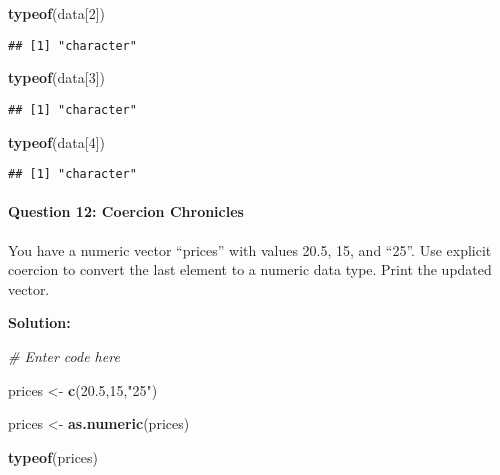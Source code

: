\documentclass[
]{article}
\newenvironment{Shaded}{\begin{snugshade}}{\end{snugshade}}
\newcommand{\CommentTok}[1]{\textcolor[rgb]{0.56,0.35,0.01}{\textit{#1}}}
\newcommand{\DecValTok}[1]{\textcolor[rgb]{0.00,0.00,0.81}{#1}}
\newcommand{\FloatTok}[1]{\textcolor[rgb]{0.00,0.00,0.81}{#1}}
\newcommand{\FunctionTok}[1]{\textcolor[rgb]{0.13,0.29,0.53}{\textbf{#1}}}
\newcommand{\NormalTok}[1]{#1}
\newcommand{\OtherTok}[1]{\textcolor[rgb]{0.56,0.35,0.01}{#1}}
\newcommand{\StringTok}[1]{\textcolor[rgb]{0.31,0.60,0.02}{#1}}
\begin{document}
\begin{Shaded}
\begin{Highlighting}[]
\FunctionTok{typeof}\NormalTok{(data[}\DecValTok{2}\NormalTok{])}
\end{Highlighting}
\end{Shaded}

\begin{verbatim}
## [1] "character"
\end{verbatim}

\begin{Shaded}
\begin{Highlighting}[]
\FunctionTok{typeof}\NormalTok{(data[}\DecValTok{3}\NormalTok{])}
\end{Highlighting}
\end{Shaded}

\begin{verbatim}
## [1] "character"
\end{verbatim}

\begin{Shaded}
\begin{Highlighting}[]
\FunctionTok{typeof}\NormalTok{(data[}\DecValTok{4}\NormalTok{])}
\end{Highlighting}
\end{Shaded}

\begin{verbatim}
## [1] "character"
\end{verbatim}

\hypertarget{question-12-coercion-chronicles}{%
\paragraph{Question 12: Coercion
Chronicles}\label{question-12-coercion-chronicles}}

You have a numeric vector ``prices'' with values 20.5, 15, and ``25''.
Use explicit coercion to convert the last element to a numeric data
type. Print the updated vector.

\textbf{Solution:}

\begin{Shaded}
\begin{Highlighting}[]
\CommentTok{\# Enter code here}

\NormalTok{prices }\OtherTok{\textless{}{-}} \FunctionTok{c}\NormalTok{(}\FloatTok{20.5}\NormalTok{,}\DecValTok{15}\NormalTok{,}\StringTok{"25"}\NormalTok{)}

\NormalTok{prices }\OtherTok{\textless{}{-}} \FunctionTok{as.numeric}\NormalTok{(prices)}

\FunctionTok{typeof}\NormalTok{(prices)}
\end{Highlighting}
\end{Shaded}
\end{document}
